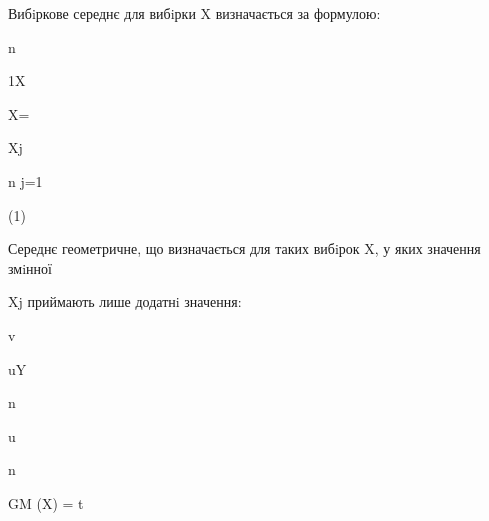 \documentclass[a4paper,portrait,12pt]{article}
\begin{document}
\begin{flushleft}
Вибiркове середнє для вибiрки X визначається за формулою:
\end{flushleft}


\begin{flushleft}
n
\end{flushleft}





\begin{flushleft}
1X
\end{flushleft}


\begin{flushleft}
X=
\end{flushleft}


\begin{flushleft}
Xj
\end{flushleft}


\begin{flushleft}
n j=1
\end{flushleft}





(1)





\begin{flushleft}
Середнє геометричне, що визначається для таких вибiрок X, у яких значення змiнної
\end{flushleft}


\begin{flushleft}
Xj приймають лише додатнi значення:
\end{flushleft}


\begin{flushleft}
v
\end{flushleft}


\begin{flushleft}
uY
\end{flushleft}


\begin{flushleft}
n
\end{flushleft}


\begin{flushleft}
u
\end{flushleft}


\begin{flushleft}
n
\end{flushleft}


\begin{flushleft}
GM (X) = t
\end{flushleft}
\end{document}
